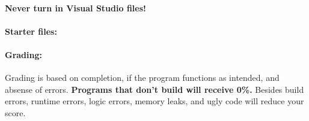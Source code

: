             ~\\ \textbf{ \color{red} Never turn in Visual Studio files! }

        \paragraph{Starter files:} \laStarterFiles

        \paragraph{Grading:}
            Grading is based on completion, if the program functions as intended,
            and absense of errors. \textbf{ \color{red} Programs that don't build will receive 0\%. }
            Besides build errors, runtime errors, logic errors, memory leaks, and ugly code will reduce your score.


        \tableofcontents

    \newpage
